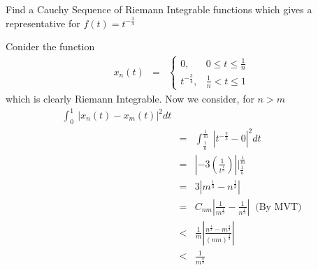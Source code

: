 \documentclass[11pt]{SelfArxOneColBMN}
\begin{document}
\begin{exercise}
Find a Cauchy Sequence of Riemann Integrable functions which gives a representative for $f(t) = t^{-\frac{3}{4}}$
\end{exercise}

\begin{solution}
Conider the function 
\begin{eqnarray*}
x_n(t) &=&
\left \{
\begin{array}{ll}
0, & 0 \leq t \leq \frac{1}{n}\\
t^{-\frac{3}{4}}, & \frac{1}{n} < t \leq 1
\end{array}
\right .
\end{eqnarray*}
which is clearly Riemann Integrable. Now we consider, for $n > m$
\begin{eqnarray*}
  \int_0^1\:|x_n(t) - x_m(t)|^2dt\\
  &=& \int_\frac{1}{n}^\frac{1}{m}\:|t^{-\frac{2}{3}} - 0|^2dt\\
  &=& |-3(\frac{1}{t^\frac{1}{3}})||_\frac{1}{n}^\frac{1}{m}\\
  &=& 3|m^\frac{1}{3} - n^\frac{1}{3}|\\
  &=& C_{nm}|\frac{1}{m^\frac{1}{3}} - \frac{1}{n^\frac{1}{3}}| \;\; \text{(By MVT)}\\
  &<& \frac{1}{m}|\frac{n^\frac{4}{3} - m^\frac{4}{3}}{(mn)^\frac{4}{3}}|\\
  &<& \frac{1}{m^\frac{8}{3}}
\end{eqnarray*}
\end{solution}
\end{document}
